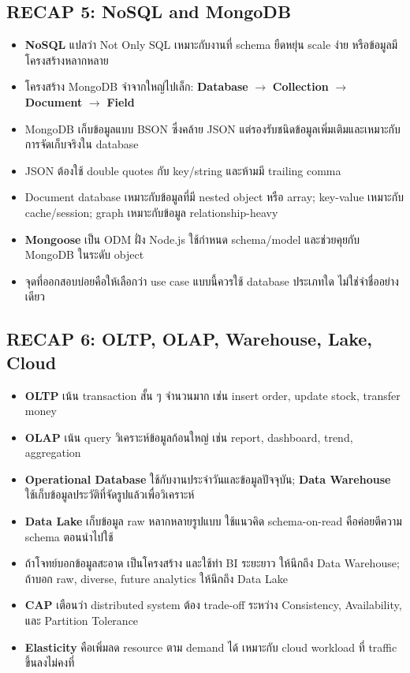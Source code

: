 \documentclass[a4paper,12pt]{article}
\begin{document}
\subsection*{RECAP 5: NoSQL and MongoDB}
\begin{itemize}
    \item \textbf{NoSQL} แปลว่า Not Only SQL เหมาะกับงานที่ schema ยืดหยุ่น scale ง่าย หรือข้อมูลมีโครงสร้างหลากหลาย
    \item โครงสร้าง MongoDB จำจากใหญ่ไปเล็ก: \textbf{Database} $\rightarrow$ \textbf{Collection} $\rightarrow$ \textbf{Document} $\rightarrow$ \textbf{Field}
    \item MongoDB เก็บข้อมูลแบบ BSON ซึ่งคล้าย JSON แต่รองรับชนิดข้อมูลเพิ่มเติมและเหมาะกับการจัดเก็บจริงใน database
    \item JSON ต้องใช้ double quotes กับ key/string และห้ามมี trailing comma
    \item Document database เหมาะกับข้อมูลที่มี nested object หรือ array; key-value เหมาะกับ cache/session; graph เหมาะกับข้อมูล relationship-heavy
    \item \textbf{Mongoose} เป็น ODM ฝั่ง Node.js ใช้กำหนด schema/model และช่วยคุยกับ MongoDB ในระดับ object
    \item จุดที่ออกสอบบ่อยคือให้เลือกว่า use case แบบนี้ควรใช้ database ประเภทใด ไม่ใช่จำชื่ออย่างเดียว
\end{itemize}

\subsection*{RECAP 6: OLTP, OLAP, Warehouse, Lake, Cloud}
\begin{itemize}
    \item \textbf{OLTP} เน้น transaction สั้น ๆ จำนวนมาก เช่น insert order, update stock, transfer money
    \item \textbf{OLAP} เน้น query วิเคราะห์ข้อมูลก้อนใหญ่ เช่น report, dashboard, trend, aggregation
    \item \textbf{Operational Database} ใช้กับงานประจำวันและข้อมูลปัจจุบัน; \textbf{Data Warehouse} ใช้เก็บข้อมูลประวัติที่จัดรูปแล้วเพื่อวิเคราะห์
    \item \textbf{Data Lake} เก็บข้อมูล raw หลากหลายรูปแบบ ใช้แนวคิด schema-on-read คือค่อยตีความ schema ตอนนำไปใช้
    \item ถ้าโจทย์บอกข้อมูลสะอาด เป็นโครงสร้าง และใช้ทำ BI ระยะยาว ให้นึกถึง Data Warehouse; ถ้าบอก raw, diverse, future analytics ให้นึกถึง Data Lake
    \item \textbf{CAP} เตือนว่า distributed system ต้อง trade-off ระหว่าง Consistency, Availability, และ Partition Tolerance
    \item \textbf{Elasticity} คือเพิ่มลด resource ตาม demand ได้ เหมาะกับ cloud workload ที่ traffic ขึ้นลงไม่คงที่
\end{itemize}
\end{document}
